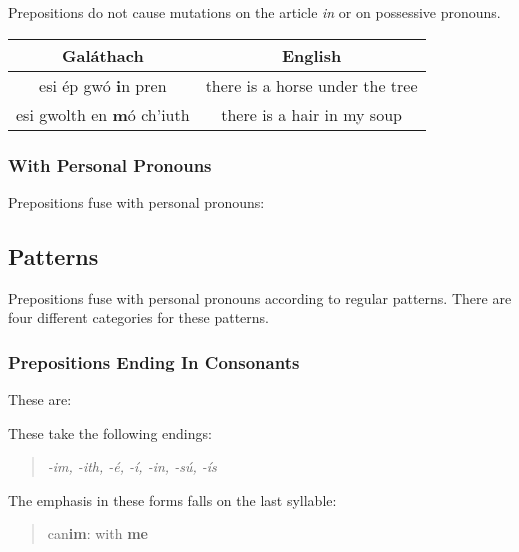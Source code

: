 Prepositions do not cause mutations on the article \textit{in} or on possessive pronouns.
\begin{table}[H]
\centering
\begin{tabu}{c|c}
  \textbf{Gal\'{a}thach} & \textbf{English}\\
  \toprule
  esi \'{e}p gw\'{o} \textbf{i}n pren & there is a horse under the tree\\
  esi gwolth en \textbf{m}\'{o} ch'iuth & there is a hair in my soup
\end{tabu}
\label{examples_prepositions_no_mutation_on_in}
\end{table}

\subsubsection{With Personal Pronouns}
Prepositions fuse with personal pronouns:

\subsection{Patterns}

Prepositions fuse with personal pronouns according to regular patterns. There are four different categories for these patterns.

\subsubsection{Prepositions Ending In Consonants}
These are:

These take the following endings:
\begin{quote}
\textit{-im, -ith, -\'{e}, -\'{i}, -in, -s\'{u}, -\'{i}s}
\end{quote}


The emphasis in these forms falls on the last syllable:
\begin{quote}
can\textbf{im}: with \textbf{me}
\end{quote}

